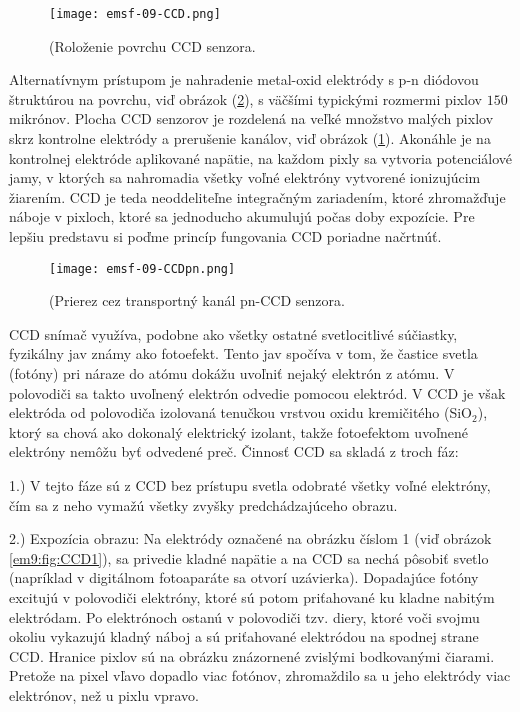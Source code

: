 \documentclass[../../main.tex]{subfiles}
\begin{document}
\begin{figure}[!h]
\texttt{[image: emsf-09-CCD.png]}
\centering
\caption{(Roloženie povrchu CCD senzora.}
\label{em9:fig:CCD}
\end{figure}

Alternatívnym prístupom je nahradenie metal-oxid elektródy s p-n diódovou štruktúrou na povrchu, viď obrázok (\ref{em9:fig:CCDpn}), s väčšími typickými rozmermi pixlov $150\,$ mikrónov. Plocha CCD senzorov je rozdelená na veľké množstvo malých pixlov skrz kontrolne elektródy a prerušenie kanálov, viď obrázok (\ref{em9:fig:CCD}). Akonáhle je na kontrolnej elektróde aplikované napätie, na každom pixly sa vytvoria potenciálové jamy, v ktorých sa nahromadia všetky voľné elektróny vytvorené ionizujúcim žiarením. CCD je teda neoddeliteľne integračným zariadením, ktoré zhromažďuje náboje v pixloch, ktoré sa jednoducho akumulujú počas doby expozície. Pre lepšiu predstavu si poďme princíp fungovania CCD poriadne načrtnúť.

\begin{figure}[!h]
\texttt{[image: emsf-09-CCDpn.png]}
\centering
\caption{(Prierez cez transportný kanál pn-CCD senzora.}
\label{em9:fig:CCDpn}
\end{figure}

CCD snímač využíva, podobne ako všetky ostatné svetlocitlivé súčiastky, fyzikálny jav známy ako fotoefekt. Tento jav spočíva v tom, že častice svetla (fotóny) pri náraze do atómu dokážu uvoľniť nejaký elektrón z atómu. V polovodiči sa takto uvoľnený elektrón odvedie pomocou elektród. V CCD je však elektróda od polovodiča izolovaná tenučkou vrstvou oxidu kremičitého (SiO$_2$), ktorý sa chová ako dokonalý elektrický izolant, takže fotoefektom uvoľnené elektróny nemôžu byť odvedené preč. Činnosť CCD sa skladá z troch fáz:

1.) V tejto fáze sú z CCD bez prístupu svetla odobraté všetky voľné elektróny, čím sa z neho vymažú všetky zvyšky predchádzajúceho obrazu.

2.) Expozícia obrazu: Na elektródy označené na obrázku číslom 1 (viď obrázok \ref{em9:fig:CCD1}), sa privedie kladné napätie a na CCD sa nechá pôsobiť svetlo (napríklad v digitálnom fotoaparáte sa otvorí uzávierka). Dopadajúce fotóny excitujú v polovodiči elektróny, ktoré sú potom priťahované ku kladne nabitým elektródam. Po elektrónoch ostanú v polovodiči tzv. diery, ktoré voči svojmu okoliu vykazujú kladný náboj a sú priťahované elektródou na spodnej strane CCD. Hranice pixlov sú na obrázku znázornené zvislými bodkovanými čiarami. Pretože na pixel vľavo dopadlo viac fotónov, zhromaždilo sa u jeho elektródy viac elektrónov, než u pixlu vpravo.
\end{document}
